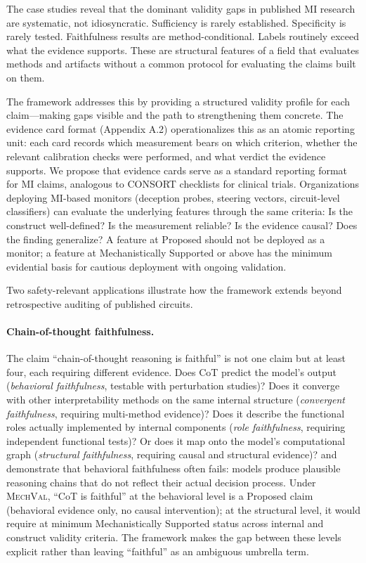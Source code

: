 \documentclass[10pt]{article}
\newcommand{\mechval}{\textsc{MechVal}}
\begin{document}
The case studies reveal that the dominant validity gaps in published MI research are systematic, not idiosyncratic. Sufficiency is rarely established. Specificity is rarely tested. Faithfulness results are method-conditional. Labels routinely exceed what the evidence supports. These are structural features of a field that evaluates methods and artifacts without a common protocol for evaluating the claims built on them.

The framework addresses this by providing a structured validity profile for each claim---making gaps visible and the path to strengthening them concrete. The evidence card format (Appendix A.2) operationalizes this as an atomic reporting unit: each card records which measurement bears on which criterion, whether the relevant calibration checks were performed, and what verdict the evidence supports. We propose that evidence cards serve as a standard reporting format for MI claims, analogous to CONSORT checklists for clinical trials. Organizations deploying MI-based monitors (deception probes, steering vectors, circuit-level classifiers) can evaluate the underlying features through the same criteria: Is the construct well-defined? Is the measurement reliable? Is the evidence causal? Does the finding generalize? A feature at Proposed should not be deployed as a monitor; a feature at Mechanistically Supported or above has the minimum evidential basis for cautious deployment with ongoing validation.

Two safety-relevant applications illustrate how the framework extends beyond retrospective auditing of published circuits.

\paragraph{Chain-of-thought faithfulness.}
The claim ``chain-of-thought reasoning is faithful'' is not one claim but at least four, each requiring different evidence.  Does CoT predict the model's output (\emph{behavioral faithfulness}, testable with perturbation studies)?  Does it converge with other interpretability methods on the same internal structure (\emph{convergent faithfulness}, requiring multi-method evidence)?  Does it describe the functional roles actually implemented by internal components (\emph{role faithfulness}, requiring independent functional tests)?  Or does it map onto the model's computational graph (\emph{structural faithfulness}, requiring causal and structural evidence)?  \citet{lanham2023measuring} and \citet{turpin2024unfaithful} demonstrate that behavioral faithfulness often fails: models produce plausible reasoning chains that do not reflect their actual decision process.  Under \mechval{}, ``CoT is faithful'' at the behavioral level is a Proposed claim (behavioral evidence only, no causal intervention); at the structural level, it would require at minimum Mechanistically Supported status across internal and construct validity criteria.  The framework makes the gap between these levels explicit rather than leaving ``faithful'' as an ambiguous umbrella term.
\end{document}
